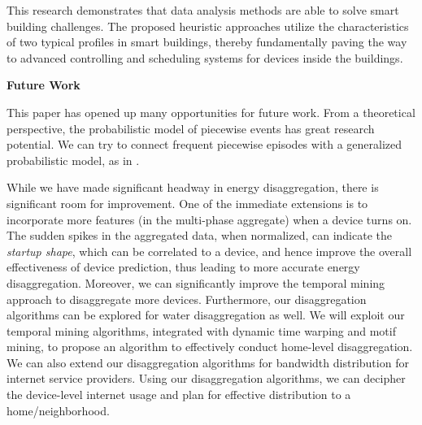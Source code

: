 This research demonstrates that data analysis methods are able to solve smart building challenges. The proposed heuristic approaches utilize the characteristics of two typical profiles in smart buildings, thereby fundamentally paving the way to advanced controlling and scheduling systems for devices inside the buildings. 


\textbf{Future Work}

This paper has opened up many opportunities for future work. From a theoretical perspective, 
the probabilistic model of piecewise events has great research potential. We can try to connect frequent piecewise episodes with a generalized probabilistic model, as in \cite{laxman2005discovering}. %

While we have made significant headway in energy disaggregation, there is significant room for improvement. One of the immediate extensions is to incorporate more features (in the multi-phase aggregate) when a device turns on. The sudden spikes in the aggregated data, when normalized, can indicate the \emph{startup shape}, which can be correlated to a device, and hence improve the overall effectiveness of device prediction, thus leading to more accurate energy disaggregation. Moreover, we can significantly improve the temporal mining approach to disaggregate more devices. Furthermore, our disaggregation algorithms can be explored for water disaggregation as well. We will exploit our temporal mining algorithms, integrated with dynamic time warping and motif mining, to propose an algorithm to effectively conduct home-level disaggregation. We can also extend our disaggregation algorithms for bandwidth distribution for internet service providers. Using our disaggregation algorithms, we can decipher the device-level internet usage and plan for effective distribution to a home/neighborhood. 

